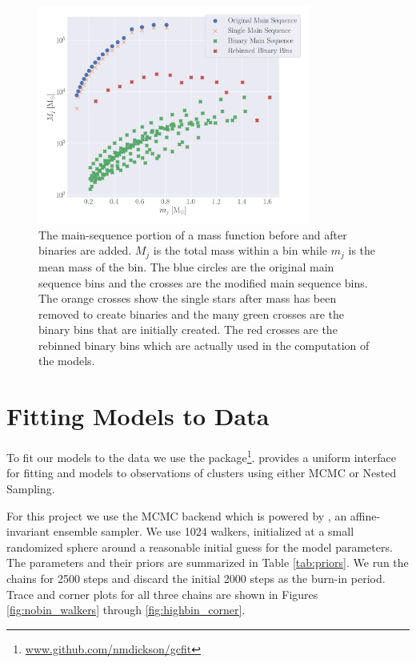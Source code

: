 \begin{figure}
    \centering
    \includegraphics[width=0.8\textwidth]{figures/shifted-mf.png}
    \caption{The main-sequence portion of a mass function before and after binaries are added. $M_j$
        is the total mass within a bin while $m_j$ is the mean mass of the bin. The blue circles are
the original main sequence bins and the crosses are the modified main sequence bins. The
orange crosses show the single stars after mass has been removed to create binaries and the
many green crosses are the binary bins that are initially created. The red crosses are the
        rebinned binary bins which are actually used in the computation of the 
        models.}
    \label{fig:2/shifted-mf}
\end{figure}



\section{Fitting Models to Data}


To fit our models to the data we use the 
package\footnote{\url{www.github.com/nmdickson/gcfit}}.  provides a uniform interface
for fitting \evolvemf{} and  models to observations of clusters using either MCMC or
Nested Sampling.

For this project we use the MCMC backend which is powered by 
\citet{Foreman-Mackey2013,Foreman-Mackey2019}, an affine-invariant ensemble  sampler. We use 1024
walkers, initialized at a small randomized sphere around a reasonable initial guess  for the model
parameters. The parameters and their priors are summarized in Table \ref{tab:priors}. We run the
chains for 2500 steps and discard the initial 2000 steps as the burn-in period. Trace and corner
\citep{Foreman-Mackey2016} plots for all three chains are shown in Figures \ref{fig:nobin_walkers}
through \ref{fig:highbin_corner}.

